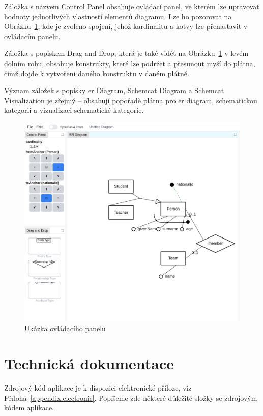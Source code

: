 Záložka s názvem Control Panel obsahuje ovládací panel, ve kterém lze upravovat hodnoty jednotlivých vlastností elementů diagramu.
Lze ho pozorovat na Obrázku~\ref{fig:control-panel}, kde je zvoleno spojení, jehož kardinalitu a kotvy lze přenastavit v ovládacím panelu.

Záložka s popiskem Drag and Drop, která je také vidět na Obrázku~\ref{fig:control-panel} v levém dolním rohu, obsahuje konstrukty, které lze podržet a přesunout myší do plátna, čímž dojde k vytvoření daného konstruktu v daném plátně.

Význam záložek s popisky \acrshort{er} Diagram, Schemcat Diagram a Schemcat Visualization je zřejmý -- obsahují popořadě plátna pro \acrshort{er} diagram, schematickou kategorii a vizualizaci schematické kategorie.

\begin{figure}[!htb]
 \centering 
 \includegraphics[width=\maxwidth{\textwidth}]{../img/app/control-panel.png}
 \caption{Ukázka ovládacího panelu}
 \label{fig:control-panel}
\end{figure}

\section{Technická dokumentace}

Zdrojový kód aplikace je k dispozici elektronické příloze, viz Příloha~\ref{appendix:electronic}.
Popíšeme zde některé důležité složky se zdrojovým kódem aplikace.

